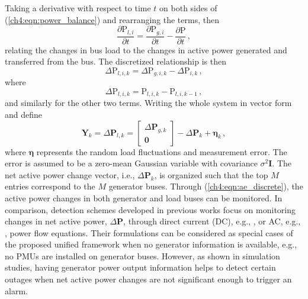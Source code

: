 Taking a derivative with respect to time $t$ on both sides
of (\ref{ch4:eqn:power_balance}) and rearranging the terms, then 
\begin{equation}
    \frac{\partial \text{P}_{l, i}}{\partial t} = \frac{\partial \text{P}_{g, i}}{\partial t} -  \frac{\partial \text{P}}{\partial t} \,,
\end{equation}
relating the changes in bus load to the changes in active power generated and transferred from the bus. The discretized relationship is then
\begin{equation}
\label{ch4:eqn:ae_discrete}
\Delta\text{P}_{l, i, k} = \Delta\text{P}_{g, i, k} -  \Delta\text{P}_{i, k}\,,
\end{equation}
where 
$$
\Delta\text{P}_{l, i, k} = \text{P}_{l, i, k} - \text{P}_{l, i, k-1} \,,
$$
and similarly for the other two terms. Writing the whole system in vector form and define
\begin{equation}
\label{ch4:eqn:ae_discrete}
\boldsymbol{Y}_{k} = \Delta\textbf{P}_{l, k} =
\left[
\begin{array}{c}
\Delta\textbf{P}_{g, k} \\
\boldsymbol{0}\,
\end{array}
\right]  - 
\Delta\textbf{P}_{k} + \boldsymbol{\eta}_k\,,
\end{equation}
where $\boldsymbol{\eta}$ represents the random load fluctuations and measurement error. The error is assumed to be a zero-mean Gaussian variable with covariance $\sigma^2\mathbf{I}$. The net active power change vector, i.e., $\Delta\textbf{P}_{k}$, is organized such that the top $M$ entries correspond to the $M$ generator buses. 
Through (\ref{ch4:eqn:ae_discrete}), the active power changes in both generator and load buses can be monitored. In comparison, detection schemes developed in previous works focus on monitoring changes in net active power, $\Delta\boldsymbol{\text{P}}$, through direct current (DC), e.g., \cite{Chen2016}, or AC, e.g., \cite{yang2020control}, power flow equations. Their formulations can be considered as special cases of the proposed unified framework when no generator information is available, e.g., no PMUs are installed on generator buses. However, as shown in simulation studies, having generator power output information helps to detect certain outages when net active power changes are not significant enough to trigger an alarm.

